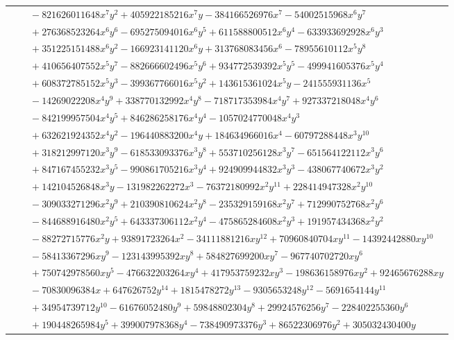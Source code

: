 \documentclass[11pt]{article}
\begin{document}
\begin{longtable}{@{}ll@{}}
 & $\quad -821626011648x^{7}y^{2}+405922185216x^{7}y-384166526976x^{7}-54002515968x^{6}y^{7}$\\
 & $\quad +276368523264x^{6}y^{6}-695275094016x^{6}y^{5}+611588800512x^{6}y^{4}-633933692928x^{6}y^{3}$\\
 & $\quad +351225151488x^{6}y^{2}-166923141120x^{6}y+313768083456x^{6}-78955610112x^{5}y^{8}$\\
 & $\quad +410656407552x^{5}y^{7}-882666602496x^{5}y^{6}+934772539392x^{5}y^{5}-499941605376x^{5}y^{4}$\\
 & $\quad +608372785152x^{5}y^{3}-399367766016x^{5}y^{2}+143615361024x^{5}y-241555931136x^{5}$\\
 & $\quad -14269022208x^{4}y^{9}+338770132992x^{4}y^{8}-718717353984x^{4}y^{7}+927337218048x^{4}y^{6}$\\
 & $\quad -842199957504x^{4}y^{5}+846286258176x^{4}y^{4}-1057024770048x^{4}y^{3}$\\
 & $\quad +632621924352x^{4}y^{2}-196440883200x^{4}y+184634966016x^{4}-60797288448x^{3}y^{10}$\\
 & $\quad +318212997120x^{3}y^{9}-618533093376x^{3}y^{8}+553710256128x^{3}y^{7}-651564122112x^{3}y^{6}$\\
 & $\quad +847167455232x^{3}y^{5}-990861705216x^{3}y^{4}+924909944832x^{3}y^{3}-438067740672x^{3}y^{2}$\\
 & $\quad +142104526848x^{3}y-131982262272x^{3}-76372180992x^{2}y^{11}+228414947328x^{2}y^{10}$\\
 & $\quad -309033271296x^{2}y^{9}+210390810624x^{2}y^{8}-235329159168x^{2}y^{7}+712990752768x^{2}y^{6}$\\
 & $\quad -844688916480x^{2}y^{5}+643337306112x^{2}y^{4}-475865284608x^{2}y^{3}+191957434368x^{2}y^{2}$\\
 & $\quad -88272715776x^{2}y+93891723264x^{2}-34111881216xy^{12}+70960840704xy^{11}-14392442880xy^{10}$\\
 & $\quad -58413367296xy^{9}-123143995392xy^{8}+584827699200xy^{7}-967740702720xy^{6}$\\
 & $\quad +750742978560xy^{5}-476632203264xy^{4}+417953759232xy^{3}-198636158976xy^{2}+92465676288xy$\\
 & $\quad -70830096384x+647626752y^{14}+1815478272y^{13}-9305653248y^{12}-5691654144y^{11}$\\
 & $\quad +34954739712y^{10}-61676052480y^{9}+59848802304y^{8}+29924576256y^{7}-228402255360y^{6}$\\
 & $\quad +190448265984y^{5}+399007978368y^{4}-738490973376y^{3}+86522306976y^{2}+305032430400y$\\

\end{longtable}
\end{document}
